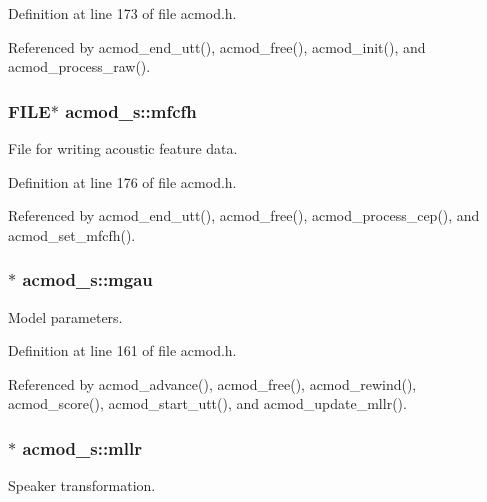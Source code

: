 Definition at line 173 of file acmod.\+h.



Referenced by acmod\+\_\+end\+\_\+utt(), acmod\+\_\+free(), acmod\+\_\+init(), and acmod\+\_\+process\+\_\+raw().

\subsubsection[{mfcfh}]{\setlength{\rightskip}{0pt plus 5cm}F\+I\+L\+E$\ast$ acmod\+\_\+s\+::mfcfh}\label{structacmod__s_a71903df6839f1f9fcfc2ef2a62a94f8e}


File for writing acoustic feature data. 



Definition at line 176 of file acmod.\+h.



Referenced by acmod\+\_\+end\+\_\+utt(), acmod\+\_\+free(), acmod\+\_\+process\+\_\+cep(), and acmod\+\_\+set\+\_\+mfcfh().

\subsubsection[{mgau}]{$\ast$ acmod\+\_\+s\+::mgau}\label{structacmod__s_a023addd9fe7252d87c683e02485cdafd}


Model parameters. 



Definition at line 161 of file acmod.\+h.



Referenced by acmod\+\_\+advance(), acmod\+\_\+free(), acmod\+\_\+rewind(), acmod\+\_\+score(), acmod\+\_\+start\+\_\+utt(), and acmod\+\_\+update\+\_\+mllr().

\subsubsection[{mllr}]{$\ast$ acmod\+\_\+s\+::mllr}\label{structacmod__s_a4edbfa1a1324c6db27b74de7d0158e5e}


Speaker transformation. 



